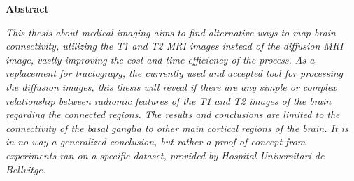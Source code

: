 \thispagestyle{plain}
\begin{center}
    \Large
    \textbf{Abstract}
\end{center}
\textit{This thesis about medical imaging aims to find alternative ways to map brain connectivity, utilizing the T1 and T2 MRI images instead of the diffusion MRI image, vastly improving the cost and time efficiency of the process. As a replacement for tractograpy, the currently used and accepted tool for processing the diffusion images, this thesis will reveal if there are any simple or complex relationship between radiomic features of the T1 and T2 images of the brain regarding the connected regions. The results and conclusions are limited to the connectivity of the basal ganglia to other main cortical regions of the brain. It is in no way a generalized conclusion, but rather a proof of concept from experiments ran on a specific dataset, provided by Hospital Universitari de Bellvitge.}